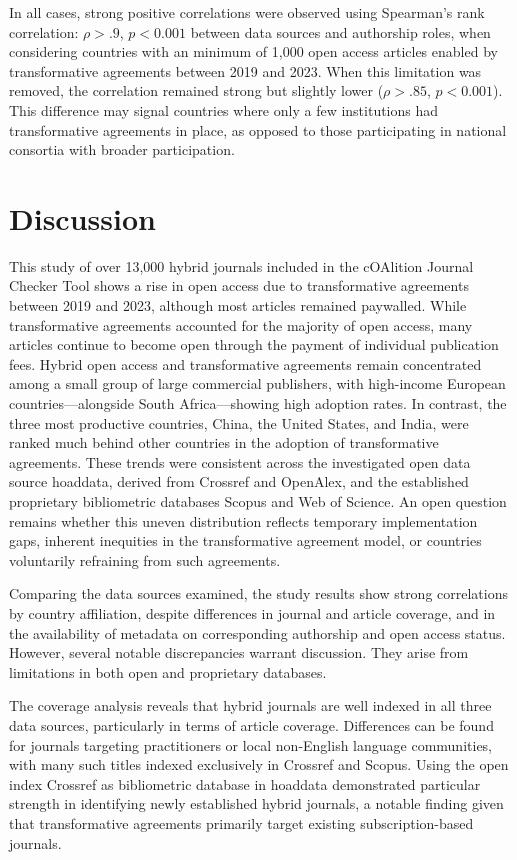 \documentclass[a4paper,man,floatsintext,longtable,noextraspace,10pt]{apa6}
\begin{document}
In all cases, strong positive correlations were observed using
Spearman's rank correlation: \(\rho > .9\), \(p < 0.001\) between data
sources and authorship roles, when considering countries with an minimum
of 1,000 open access articles enabled by transformative agreements
between 2019 and 2023. When this limitation was removed, the correlation
remained strong but slightly lower (\(\rho > .85\), \(p < 0.001\)). This
difference may signal countries where only a few institutions had
transformative agreements in place, as opposed to those participating in
national consortia with broader participation.

\section{Discussion}\label{discussion}

This study of over 13,000 hybrid journals included in the cOAlition
Journal Checker Tool shows a rise in open access due to transformative
agreements between 2019 and 2023, although most articles remained
paywalled. While transformative agreements accounted for the majority of
open access, many articles continue to become open through the payment
of individual publication fees. Hybrid open access and transformative
agreements remain concentrated among a small group of large commercial
publishers, with high-income European countries---alongside South
Africa---showing high adoption rates. In contrast, the three most
productive countries, China, the United States, and India, were ranked
much behind other countries in the adoption of transformative
agreements. These trends were consistent across the investigated open
data source hoaddata, derived from Crossref and OpenAlex, and the
established proprietary bibliometric databases Scopus and Web of
Science. An open question remains whether this uneven distribution
reflects temporary implementation gaps, inherent inequities in the
transformative agreement model, or countries voluntarily refraining from
such agreements.

Comparing the data sources examined, the study results show strong
correlations by country affiliation, despite differences in journal and
article coverage, and in the availability of metadata on corresponding
authorship and open access status. However, several notable
discrepancies warrant discussion. They arise from limitations in both
open and proprietary databases.

The coverage analysis reveals that hybrid journals are well indexed in
all three data sources, particularly in terms of article coverage.
Differences can be found for journals targeting practitioners or local
non-English language communities, with many such titles indexed
exclusively in Crossref and Scopus. Using the open index Crossref as
bibliometric database in hoaddata demonstrated particular strength in
identifying newly established hybrid journals, a notable finding given
that transformative agreements primarily target existing
subscription-based journals.
\end{document}

